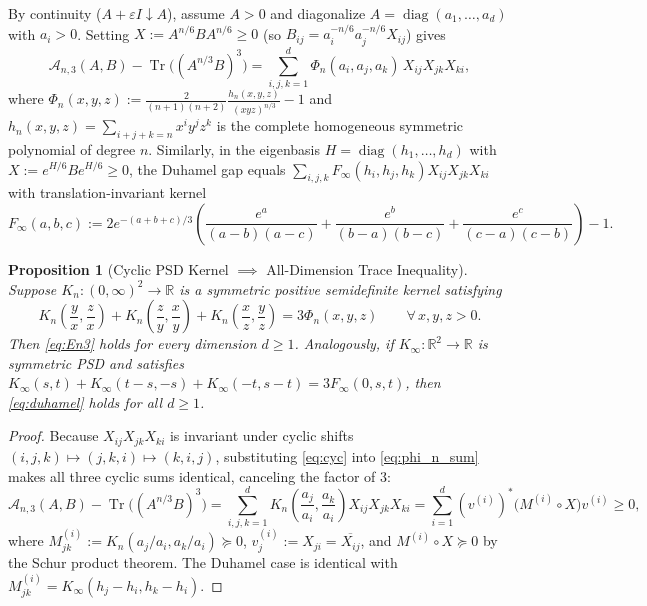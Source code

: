 \documentclass[11pt,a4paper]{article}
\newtheorem{proposition}[theorem]{Proposition}
\theoremstyle{remark}
\newcommand{\Tr}{\operatorname{Tr}}
\begin{document}
By continuity ($A+\varepsilon I \downarrow A$), assume $A>0$ and diagonalize $A=\operatorname{diag}(a_1,\dots,a_d)$ with $a_i>0$. Setting $X := A^{n/6} B A^{n/6} \ge 0$ (so $B_{ij} = a_i^{-n/6}a_j^{-n/6}X_{ij}$) gives
\begin{equation}\label{eq:phi_n_sum}
  \mathcal{A}_{n,3}(A,B) - \Tr\!\big((A^{n/3}B)^3\big) = \sum_{i,j,k=1}^d \Phi_n(a_i,a_j,a_k)\,X_{ij}X_{jk}X_{ki},
\end{equation}
where $\Phi_n(x,y,z) := \frac{2}{(n+1)(n+2)}\frac{h_n(x,y,z)}{(xyz)^{n/3}} - 1$ and $h_n(x,y,z) = \sum_{i+j+k=n} x^i y^j z^k$ is the complete homogeneous symmetric polynomial of degree $n$. Similarly, in the eigenbasis $H=\operatorname{diag}(h_1,\dots,h_d)$ with $X := e^{H/6}Be^{H/6}\ge 0$, the Duhamel gap equals $\sum_{i,j,k} F_\infty(h_i,h_j,h_k) X_{ij}X_{jk}X_{ki}$ with translation-invariant kernel
\[
F_\infty(a,b,c) := 2 e^{-(a+b+c)/3}\!\left(\frac{e^a}{(a-b)(a-c)} + \frac{e^b}{(b-a)(b-c)} + \frac{e^c}{(c-a)(c-b)}\right) - 1.
\]

\begin{proposition}[Cyclic PSD Kernel $\implies$ All-Dimension Trace Inequality]\label{prop:schur}
Suppose $K_n:(0,\infty)^2\to\mathbb{R}$ is a symmetric positive semidefinite kernel satisfying
\begin{equation}\label{eq:cyc}
  K_n\!\left(\frac{y}{x},\frac{z}{x}\right) + K_n\!\left(\frac{z}{y},\frac{x}{y}\right) + K_n\!\left(\frac{x}{z},\frac{y}{z}\right) = 3\Phi_n(x,y,z) \qquad \forall\,x,y,z>0.
\end{equation}
Then \eqref{eq:En3} holds for every dimension $d\ge 1$. Analogously, if $K_\infty:\mathbb{R}^2\to\mathbb{R}$ is symmetric PSD and satisfies $K_\infty(s,t)+K_\infty(t-s,-s)+K_\infty(-t,s-t) = 3F_\infty(0,s,t)$, then \eqref{eq:duhamel} holds for all $d\ge 1$.
\end{proposition}

\begin{proof}
Because $X_{ij}X_{jk}X_{ki}$ is invariant under cyclic shifts $(i,j,k)\mapsto(j,k,i)\mapsto(k,i,j)$, substituting \eqref{eq:cyc} into \eqref{eq:phi_n_sum} makes all three cyclic sums identical, canceling the factor of $3$:
\[
\mathcal{A}_{n,3}(A,B) - \Tr\!\big((A^{n/3}B)^3\big)
= \sum_{i,j,k=1}^d K_n\!\left(\frac{a_j}{a_i},\frac{a_k}{a_i}\right) X_{ij}X_{jk}X_{ki}
= \sum_{i=1}^d (v^{(i)})^*\big(M^{(i)} \circ X\big) v^{(i)} \ge 0,
\]
where $M^{(i)}_{jk} := K_n(a_j/a_i, a_k/a_i)\succeq 0$, $v^{(i)}_j := X_{ji} = \overline{X_{ij}}$, and $M^{(i)}\circ X \succeq 0$ by the Schur product theorem. The Duhamel case is identical with $M^{(i)}_{jk} = K_\infty(h_j-h_i, h_k-h_i)$.
\end{proof}
\end{document}
